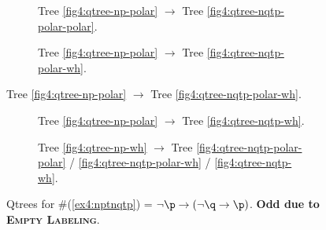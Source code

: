 \begin{figure}[H]
	\centering
	\begin{subfigure}[b]{.45\linewidth}
		\centering
		\scalebox{1}{
			\begin{forest}
				[CS[\p][$\neg\p$[\q][$\neg\q\cap\neg\p$]]]
			\end{forest}
		}
		\caption[]{Tree \ref{fig4:qtree-np-polar} $\rightarrow$ Tree \ref{fig4:qtree-nqtp-polar-polar}.}
	\end{subfigure}
	\hfill
	\begin{subfigure}[b]{.45\linewidth}
		\centering
		\scalebox{1}{
			\begin{forest}
				[CS[\p][$\neg\p$[\q][$\neg\q\cap\neg\p$[\r][...]]]]
			\end{forest}
		}
		\caption[]{Tree \ref{fig4:qtree-np-polar} $\rightarrow$ Tree \ref{fig4:qtree-nqtp-polar-wh}.}
	\end{subfigure}
\end{figure}
\begin{figure}[H]
	\centering
	\ContinuedFloat
	\begin{subfigure}[b]{.45\linewidth}
		\centering
		\scalebox{1}{
			\begin{forest}
				[CS[\p][$\neg\p$[\q][\r][...]]]
			\end{forest}
		}
		\caption[]{Tree \ref{fig4:qtree-np-polar} $\rightarrow$ Tree \ref{fig4:qtree-nqtp-wh}.}
	\end{subfigure}
	\hfill
	\begin{subfigure}[b]{.45\linewidth}
		\centering
		\scalebox{1}{
			\begin{forest}
				[CS[\p][\q][\r][...]]
			\end{forest}
		}
		\caption[]{Tree \ref{fig4:qtree-np-wh} $\rightarrow$ Tree \ref{fig4:qtree-nqtp-polar-polar} / \ref{fig4:qtree-nqtp-polar-wh} /  \ref{fig4:qtree-nqtp-wh}.}
	\end{subfigure}
	\caption[]{Qtrees for \#(\ref{ex4:nptnqtp}) = $\neg\p \rightarrow(\neg\q \rightarrow\p)$. \textbf{Odd due to \textsc{Empty Labeling}}.}\label{fig4:qtrees-npt(nqtp)}
\end{figure}


